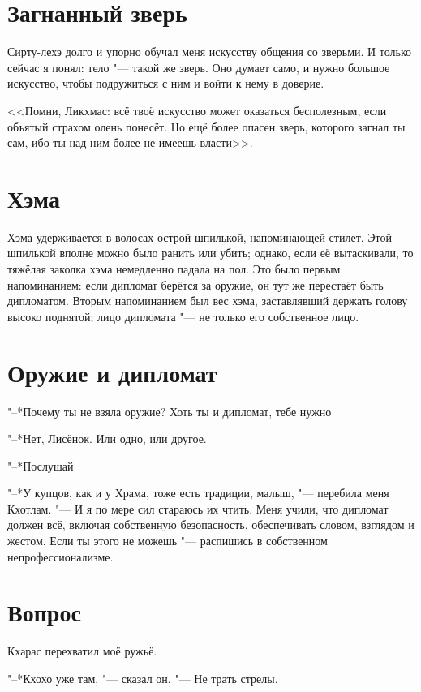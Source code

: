 \section{Загнанный зверь}

Сирту-лехэ долго и упорно обучал меня искусству общения со зверьми.
И только сейчас я понял: тело "--- такой же зверь.
Оно думает само, и нужно большое искусство, чтобы подружиться с ним и войти к нему в доверие.

<<Помни, Ликхмас: всё твоё искусство может оказаться бесполезным, если объятый страхом олень понесёт.
Но ещё более опасен зверь, которого загнал ты сам, ибо ты над ним более не имеешь власти>>.

\section{Хэма}

Хэма удерживается в волосах острой шпилькой, напоминающей стилет.
Этой шпилькой вполне можно было ранить или убить;
однако, если её вытаскивали, то тяжёлая заколка хэма немедленно падала на пол.
Это было первым напоминанием: если дипломат берётся за оружие, он тут же перестаёт быть дипломатом.
Вторым напоминанием был вес хэма, заставлявший держать голову высоко поднятой;
лицо дипломата "--- не только его собственное лицо.

\section{Оружие и дипломат}

"--*Почему ты не взяла оружие?
Хоть ты и дипломат, тебе нужно\ldotst

"--*Нет, Лисёнок.
Или одно, или другое.

"--*Послушай\ldotst

"--*У купцов, как и у Храма, тоже есть традиции, малыш, "--- перебила меня Кхотлам.
"--- И я по мере сил стараюсь их чтить.
Меня учили, что дипломат должен всё, включая собственную безопасность, обеспечивать словом, взглядом и жестом.
Если ты этого не можешь "--- распишись в собственном непрофессионализме.

\section{Вопрос}

Кхарас перехватил моё ружьё.

"--*Кхохо уже там, "--- сказал он.
"--- Не трать стрелы.

